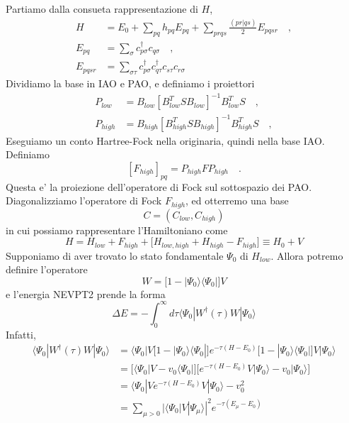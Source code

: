 \documentclass{report}
\begin{document}
\noindent
Partiamo dalla consueta rappresentazione di $H$,
\begin{equation}
\begin{split}
H &= E_0 + \sum_{pq} h_{pq} E_{pq} + \sum_{prqs} \frac{(pr|qs)}{2} E_{pqsr}
\quad, \\
E_{pq} &= \sum_\sigma c^\dagger_{p\sigma} c_{q\sigma} 
\quad, \\
E_{pqsr} &= \sum_{\sigma\tau} c^\dagger_{p\sigma} c^\dagger_{q\tau} c_{s\tau} c_{r\sigma} 
\end{split}
\end{equation}
Dividiamo la base in IAO e PAO, e definiamo i proiettori
\begin{equation}
\begin{split}
P_{low} &= B_{low} \left[ B_{low}^T S B_{low} \right]^{-1} B_{low}^T S \quad, \\
P_{high} &= B_{high} \left[ B_{high}^T S B_{high} \right]^{-1} B_{high}^T S \quad, 
\end{split}
\end{equation}
Eseguiamo un conto Hartree-Fock nella originaria, quindi nella base IAO. Definiamo
\begin{equation}
\left[ F_{high} \right]_{pq} = P_{high} F P_{high} \quad.
\end{equation}
Questa e' la proiezione dell'operatore di Fock sul sottospazio dei PAO.
Diagonalizziamo l'operatore di Fock $F_{high}$, ed otterremo una base
\begin{equation}
C = (C_{low} , C_{high} )
\end{equation}
in cui possiamo rappresentare l'Hamiltoniano come
\begin{equation}
H = H_{low} + F_{high} + \Big[ H_{low,high} + H_{high} - F_{high} \Big] \equiv H_0 + V
\end{equation}
Supponiamo di aver trovato lo stato fondamentale $\Psi_0$ di $H_{low}$. Allora potremo definire l'operatore
\begin{equation}
W = \Big[ 1 - | \Psi_0 \rangle \langle \Psi_0 | \Big] V
\end{equation}
e l'energia NEVPT2 prende la forma
\begin{equation}
\Delta E = - \int_0^\infty d\tau \langle \Psi_0 | W^\dagger(\tau) W | \Psi_0 \rangle
\end{equation}
Infatti,
\begin{equation}
\begin{split}
\langle \Psi_0 | W^\dagger(\tau) W | \Psi_0 \rangle 
&=
\langle \Psi_0 | V \Big[ 1 - | \Psi_0 \rangle \langle \Psi_0 | \Big] e^{-\tau (H-E_0)} \Big[ 1 - | \Psi_0 \rangle \langle \Psi_0 | \Big] V | \Psi_0 \rangle \\
&=
\Big[ \langle \Psi_0 | V - v_0 \langle \Psi_0 | \Big] \Big[ e^{-\tau (H-E_0)} V | \Psi_0 \rangle - v_0 | \Psi_0 \rangle \Big] \\
&=
\langle \Psi_0 | V e^{-\tau (H-E_0)} V | \Psi_0 \rangle - v_0^2 \\
&=
\sum_{\mu > 0} | \langle \Psi_0 | V | \Psi_\mu \rangle |^2 e^{-\tau (E_\mu-E_0)}
\end{split}
\end{equation}
\end{document}
